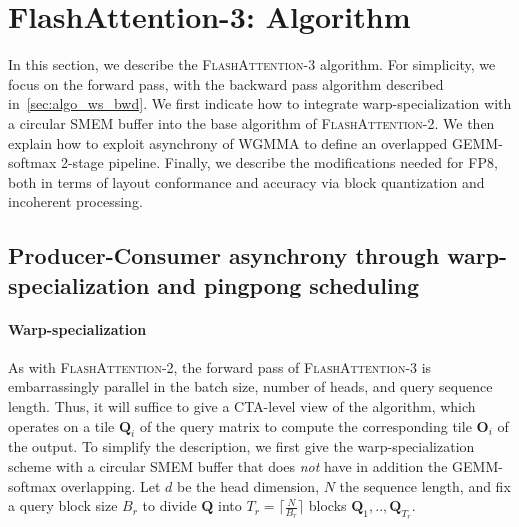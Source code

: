 \documentclass{article}
\newcommand{\vQ}{\mathbf{Q}}
\newcommand{\vO}{\mathbf{O}}
\newcommand{\faa}{\textsc{FlashAttention-2}\xspace}
\newcommand{\fat}{\textsc{FlashAttention-3}\xspace}  %
\begin{document}
\section{FlashAttention-3: Algorithm}
\label{sec:algo}

In this section, we describe the \fat algorithm. For simplicity, we focus on the
forward pass, with the backward pass algorithm described in~\cref{sec:algo_ws_bwd}. We first indicate how to integrate warp-specialization with a circular SMEM buffer into the base algorithm of \faa. We then explain how to exploit asynchrony of WGMMA to define an overlapped GEMM-softmax 2-stage pipeline. Finally, we describe the modifications needed for FP8, both in terms of layout conformance and accuracy via block quantization and incoherent processing.

\subsection{Producer-Consumer asynchrony through warp-specialization and
  pingpong scheduling}
\label{sec:algo_ws}

\paragraph{Warp-specialization}
As with \faa, the forward pass of \fat is embarrassingly parallel in the batch size, number of heads, and query sequence length.
Thus, it will suffice to give a CTA-level view of the algorithm, which operates on a tile $\vQ_i$ of the query matrix to compute the corresponding tile $\vO_i$ of the output.
To simplify the description, we first give the warp-specialization scheme with a circular SMEM buffer that does \emph{not} have in addition the GEMM-softmax overlapping.
Let $d$ be the head dimension, $N$ the sequence length, and fix a query block size $B_r$ to divide $\vQ$ into $T_r = \lceil \frac{N}{B_r} \rceil$ blocks $\vQ_1, .., \vQ_{T_r}$.
\end{document}
